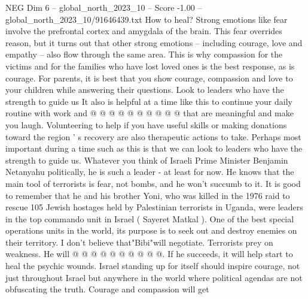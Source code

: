 \begin{textsample}{NEG Dim 6 – global\_north\_2023\_10 – Score -1.00 – global\_north\_2023\_10/91646439.txt}
How to heal?
Strong emotions like fear involve the prefrontal cortex and amygdala of the brain.
This fear overrides reason, but it turns out that other strong emotions -- including courage, love and empathy -- also flow through the same area.
This is why compassion for the victims and for the families who have lost loved ones is the best response, as is courage.
For parents, it is best that you show courage, compassion and love to your children while answering their questions.
Look to leaders who have the strength to guide us It also is helpful at a time like this to continue your daily routine with work and @ @ @ @ @ @ @ @ @ @ that are meaningful and make you laugh.
Volunteering to help if you have useful skills or making donations toward the region ' s recovery are also therapeutic actions to take.
Perhaps most important during a time such as this is that we can look to leaders who have the strength to guide us.
Whatever you think of Israeli Prime Minister Benjamin Netanyahu politically, he is such a leader - at least for now.
He knows that the main tool of terrorists is fear, not bombs, and he won't succumb to it.
It is good to remember that he and his brother Yoni, who was killed in the 1976 raid to rescue 105 Jewish hostages held by Palestinian terrorists in Uganda, were leaders in the top commando unit in Israel ( Sayeret Matkal ).
One of the best special operations units in the world, its purpose is to seek out and destroy enemies on their territory.
I don't believe that"Bibi"will negotiate.
Terrorists prey on weakness.
He will @ @ @ @ @ @ @ @ @ @.
If he succeeds, it will help start to heal the psychic wounds.
Israel standing up for itself should inspire courage, not just throughout Israel but anywhere in the world where political agendas are not obfuscating the truth.
Courage and compassion will get

\end{textsample}
